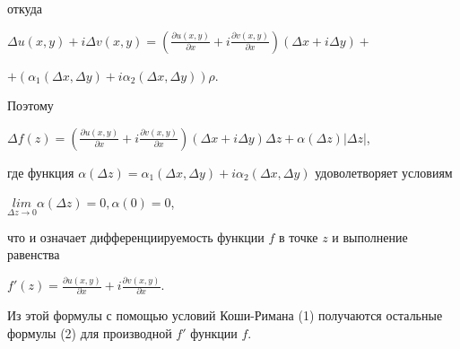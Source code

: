 \documentclass[a4paper, 12pt]{report}
\begin{document}
\par\bigskip
откуда 
\par\bigskip
\begin{center}
$\Delta u(x, y) + i\Delta v(x, y) = \left (\frac{\partial u(x, y)}{\partial x} + i\frac{\partial v(x, y)}{\partial x} \right )(\Delta x + i\Delta y) +$
\par\bigskip
   $ + (\alpha_1 (\Delta x, \Delta y) + i\alpha_2 (\Delta x, \Delta y))\rho$.
\end{center}
\par\bigskip
Поэтому
\par\bigskip
\begin{center}
$\Delta f(z) = \left (\frac{\partial u(x, y)}{\partial x} + i\frac{\partial v(x, y)}{\partial x} \right )(\Delta x + i\Delta y)\Delta z + \alpha (\Delta z)|\Delta z|$, 
\end{center}
\par\bigskip
где функция $\alpha (\Delta z) = \alpha_1 (\Delta x, \Delta y) + i\alpha_2(\Delta x, \Delta y)$ удоволетворяет условиям
\par\bigskip
\begin{center}
$\underset{\Delta z \to 0}{lim} \alpha (\Delta z) = 0,  \alpha (0) = 0$,
\end{center}
\par\bigskip
что и означает дифференциируемость функции $f$ в точке $z$ и выполнение равенства
\par\bigskip
\begin{center}
    $f'(z) = \frac{\partial u(x, y)}{\partial x} + i\frac{\partial v(x, y)}{\partial x}.$
\end{center}
\par\bigskip
Из этой формулы с помощью условий Коши-Римана (1) получаются остальные формулы (2) для производной $f'$ функции $f$.
\end{document}
